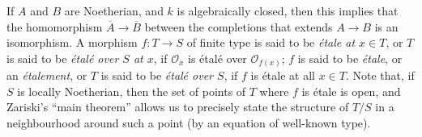 \documentclass{article}
\theoremstyle{definition}
\theoremstyle{definition}
\theoremstyle{definition}
\theoremstyle{definition}
\theoremstyle{remark}
\begin{document}
If \(A\) and \(B\) are Noetherian, and \(k\) is algebraically closed, then this implies that the homomorphism \(\overline{A}\to\overline{B}\) between the completions that extends \(A\to B\) is an isomorphism.
A morphism \(f\colon T\to S\) of finite type is said to be \emph{étale at \(x\in T\)}, or \(T\) is said to be \emph{étalé over \(S\) at \(x\)}, if \({\mathscr{O}}_x\) is étalé over \({\mathscr{O}}_{f(x)}\);
\(f\) is said to be \emph{étale}, or an \emph{étalement}, or \(T\) is said to be \emph{étalé over \(S\)}, if \(f\) is étale at all \(x\in T\).
Note that, if \(S\) is locally Noetherian, then the set of points of \(T\) where \(f\) is étale is open, and Zariski's ``main theorem'' allows us to precisely state the structure of \(T/S\) in a neighbourhood around such a point (by an equation of well-known type).
\end{document}

